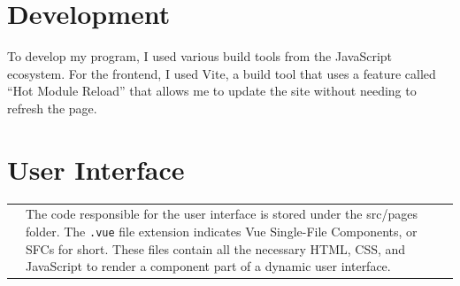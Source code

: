\documentclass[notitlepage, 12pt]{report}
\newcommand{\code}[1]{\texttt{#1}}
\begin{document}
\section*{Development}
To develop my program, I used various build tools from the JavaScript ecosystem.
For the frontend, I used Vite, a build tool that uses a feature called ``Hot Module Reload'' that allows me to update the site without needing to refresh the page.

\section*{User Interface}
\begin{xltabular}{\textwidth}{
		@{}
		p{0.3\textwidth}
		X
	}
	\centerline{}
	 &
	The code responsible for the user interface is stored under the src/pages folder.
	The \code{.vue} file extension indicates Vue Single-File Components, or SFCs for short.
	These files contain all the necessary HTML, CSS, and JavaScript to render a component part of a dynamic user interface.
\end{xltabular}

\vspace{10pt}
\end{document}
